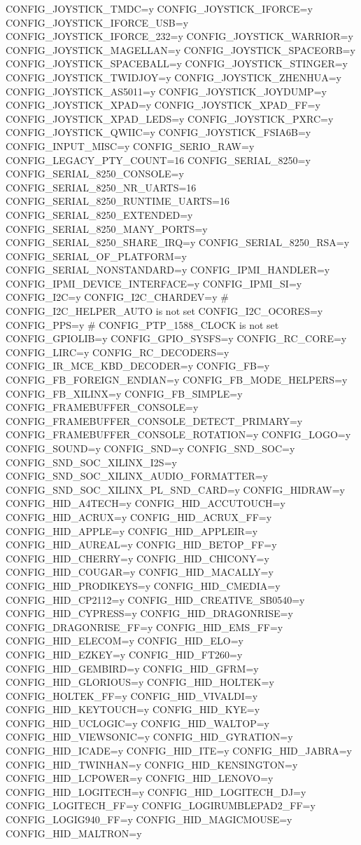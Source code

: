 \begin{CodeBlock}[language=BookConfig]
CONFIG_JOYSTICK_TMDC=y
CONFIG_JOYSTICK_IFORCE=y
CONFIG_JOYSTICK_IFORCE_USB=y
CONFIG_JOYSTICK_IFORCE_232=y
CONFIG_JOYSTICK_WARRIOR=y
CONFIG_JOYSTICK_MAGELLAN=y
CONFIG_JOYSTICK_SPACEORB=y
CONFIG_JOYSTICK_SPACEBALL=y
CONFIG_JOYSTICK_STINGER=y
CONFIG_JOYSTICK_TWIDJOY=y
CONFIG_JOYSTICK_ZHENHUA=y
CONFIG_JOYSTICK_AS5011=y
CONFIG_JOYSTICK_JOYDUMP=y
CONFIG_JOYSTICK_XPAD=y
CONFIG_JOYSTICK_XPAD_FF=y
CONFIG_JOYSTICK_XPAD_LEDS=y
CONFIG_JOYSTICK_PXRC=y
CONFIG_JOYSTICK_QWIIC=y
CONFIG_JOYSTICK_FSIA6B=y
CONFIG_INPUT_MISC=y
CONFIG_SERIO_RAW=y
CONFIG_LEGACY_PTY_COUNT=16
CONFIG_SERIAL_8250=y
CONFIG_SERIAL_8250_CONSOLE=y
CONFIG_SERIAL_8250_NR_UARTS=16
CONFIG_SERIAL_8250_RUNTIME_UARTS=16
CONFIG_SERIAL_8250_EXTENDED=y
CONFIG_SERIAL_8250_MANY_PORTS=y
CONFIG_SERIAL_8250_SHARE_IRQ=y
CONFIG_SERIAL_8250_RSA=y
CONFIG_SERIAL_OF_PLATFORM=y
CONFIG_SERIAL_NONSTANDARD=y
CONFIG_IPMI_HANDLER=y
CONFIG_IPMI_DEVICE_INTERFACE=y
CONFIG_IPMI_SI=y
CONFIG_I2C=y
CONFIG_I2C_CHARDEV=y
# CONFIG_I2C_HELPER_AUTO is not set
CONFIG_I2C_OCORES=y
CONFIG_PPS=y
# CONFIG_PTP_1588_CLOCK is not set
CONFIG_GPIOLIB=y
CONFIG_GPIO_SYSFS=y
CONFIG_RC_CORE=y
CONFIG_LIRC=y
CONFIG_RC_DECODERS=y
CONFIG_IR_MCE_KBD_DECODER=y
CONFIG_FB=y
CONFIG_FB_FOREIGN_ENDIAN=y
CONFIG_FB_MODE_HELPERS=y
CONFIG_FB_XILINX=y
CONFIG_FB_SIMPLE=y
CONFIG_FRAMEBUFFER_CONSOLE=y
CONFIG_FRAMEBUFFER_CONSOLE_DETECT_PRIMARY=y
CONFIG_FRAMEBUFFER_CONSOLE_ROTATION=y
CONFIG_LOGO=y
CONFIG_SOUND=y
CONFIG_SND=y
CONFIG_SND_SOC=y
CONFIG_SND_SOC_XILINX_I2S=y
CONFIG_SND_SOC_XILINX_AUDIO_FORMATTER=y
CONFIG_SND_SOC_XILINX_PL_SND_CARD=y
CONFIG_HIDRAW=y
CONFIG_HID_A4TECH=y
CONFIG_HID_ACCUTOUCH=y
CONFIG_HID_ACRUX=y
CONFIG_HID_ACRUX_FF=y
CONFIG_HID_APPLE=y
CONFIG_HID_APPLEIR=y
CONFIG_HID_AUREAL=y
CONFIG_HID_BETOP_FF=y
CONFIG_HID_CHERRY=y
CONFIG_HID_CHICONY=y
CONFIG_HID_COUGAR=y
CONFIG_HID_MACALLY=y
CONFIG_HID_PRODIKEYS=y
CONFIG_HID_CMEDIA=y
CONFIG_HID_CP2112=y
CONFIG_HID_CREATIVE_SB0540=y
CONFIG_HID_CYPRESS=y
CONFIG_HID_DRAGONRISE=y
CONFIG_DRAGONRISE_FF=y
CONFIG_HID_EMS_FF=y
CONFIG_HID_ELECOM=y
CONFIG_HID_ELO=y
CONFIG_HID_EZKEY=y
CONFIG_HID_FT260=y
CONFIG_HID_GEMBIRD=y
CONFIG_HID_GFRM=y
CONFIG_HID_GLORIOUS=y
CONFIG_HID_HOLTEK=y
CONFIG_HOLTEK_FF=y
CONFIG_HID_VIVALDI=y
CONFIG_HID_KEYTOUCH=y
CONFIG_HID_KYE=y
CONFIG_HID_UCLOGIC=y
CONFIG_HID_WALTOP=y
CONFIG_HID_VIEWSONIC=y
CONFIG_HID_GYRATION=y
CONFIG_HID_ICADE=y
CONFIG_HID_ITE=y
CONFIG_HID_JABRA=y
CONFIG_HID_TWINHAN=y
CONFIG_HID_KENSINGTON=y
CONFIG_HID_LCPOWER=y
CONFIG_HID_LENOVO=y
CONFIG_HID_LOGITECH=y
CONFIG_HID_LOGITECH_DJ=y
CONFIG_LOGITECH_FF=y
CONFIG_LOGIRUMBLEPAD2_FF=y
CONFIG_LOGIG940_FF=y
CONFIG_HID_MAGICMOUSE=y
CONFIG_HID_MALTRON=y

\end{CodeBlock}

